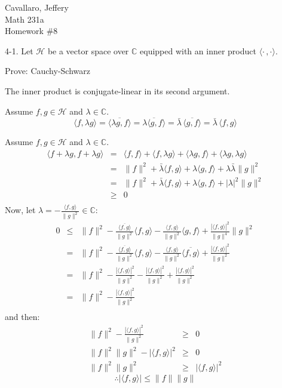 \documentclass[letterpaper,12pt,fleqn]{article}
\newcommand{\abs}[1]{\left|#1\right|}
\newcommand{\norm}[1]{\lVert#1\rVert}
\newcommand{\inner}[2]{\langle#1,#2\rangle}
\newcommand{\conj}[1]{\bar{#1}}
\newcommand{\Conj}[1]{\overline{#1}}
\newcommand{\hilb}{\mathcal{H}}
\newcommand{\C}{\mathbb{C}}
\begin{document}
\allowdisplaybreaks
Cavallaro, Jeffery \\
Math 231a \\
Homework \#8

\bigskip

\begin{description}
\item{4-1.} Let $\hilb$ be a vector space over $\C$ equipped with
an inner product $\inner{\cdot\,}{\cdot}$.

Prove: Cauchy-Schwarz

\begin{lemma}
The inner product is conjugate-linear in its second argument.
\end{lemma}

\begin{theproof}
Assume $f,g\in\hilb$ and $\lambda\in\C$.
\[\inner{f}{\lambda g}=\Conj{\inner{\lambda g}{f}}=
    \Conj{\lambda\inner{g}{f}}=
    \conj{\lambda}\,\Conj{\inner{g}{f}}=
    \conj{\lambda}\,\inner{f}{g}\]
\end{theproof}

\begin{theproof}
Assume $f,g\in\hilb$ and $\lambda\in\C$.
\begin{eqnarray*}
\inner{f+\lambda g}{f+\lambda g} &=& \inner{f}{f}+\inner{f}{\lambda g}+
    \inner{\lambda g}{f}+\inner{\lambda g}{\lambda g} \\
    &=& \norm{f}^2+\conj{\lambda}\inner{f}{g}+\lambda\inner{g}{f}+
    \lambda\conj{\lambda}\norm{g}^2 \\
    &=& \norm{f}^2+\conj{\lambda}\inner{f}{g}+\lambda\inner{g}{f}+
    \abs{\lambda}^2\norm{g}^2 \\
    &\ge& 0 \\
\end{eqnarray*}
Now, let $\lambda=-\frac{\inner{f}{g}}{\norm{g}^2}\in\C$:
\begin{eqnarray*}
0 &\le& \norm{f}^2-\frac{\Conj{\inner{f}{g}}}{\norm{g}^2}\inner{f}{g}-
    \frac{\inner{f}{g}}{\norm{g}^2}\inner{g}{f}+
    \frac{\abs{\inner{f}{g}}^2}{\norm{g}^4}\norm{g}^2 \\
  &=& \norm{f}^2-\frac{\Conj{\inner{f}{g}}}{\norm{g}^2}\inner{f}{g}-
    \frac{\inner{f}{g}}{\norm{g}^2}\Conj{\inner{f}{g}}+
    \frac{\abs{\inner{f}{g}}^2}{\norm{g}^2} \\
  &=& \norm{f}^2-\frac{\abs{\inner{f}{g}}^2}{\norm{g}^2}-
    \frac{\abs{\inner{f}{g}}^2}{\norm{g}^2}+
    \frac{\abs{\inner{f}{g}}^2}{\norm{g}^2} \\
  &=& \norm{f}^2-\frac{\abs{\inner{f}{g}}^2}{\norm{g}^2} \\
\end{eqnarray*}
and then:
\begin{eqnarray*}
\norm{f}^2-\frac{\abs{\inner{f}{g}}^2}{\norm{g}^2} &\ge& 0 \\
\norm{f}^2\norm{g}^2-\abs{\inner{f}{g}}^2 &\ge& 0 \\
\norm{f}^2\norm{g}^2 &\ge& \abs{\inner{f}{g}}^2
\end{eqnarray*}
\[\therefore \abs{\inner{f}{g}}\le\norm{f}\norm{g}\]
\end{theproof}


\end{description}
\end{document}
